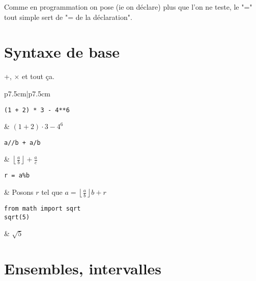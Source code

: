 \documentclass{article}
\begin{document}
Comme en programmation on pose (ie on déclare) plus que l'on ne teste, le "=" tout simple sert de "= de la déclaration".

\section{Syntaxe de base}
+, $\times$ et tout ça.
\begin{table}[h]
	\centering
	\begin{tabular}{p{7.5cm}|p{7.5cm}}
\begin{minipage}{0.5\linewidth}
\begin{verbatim}
(1 + 2) * 3 - 4**6
\end{verbatim}
\end{minipage}
       & $(1+2)\cdot 3 - 4^6$ \\
\begin{minipage}{0.5\linewidth}
\begin{verbatim}
a//b + a/b
\end{verbatim} 
\end{minipage} & $\displaystyle \left\lfloor \frac{a}{b} \right\rfloor + \frac{a}{c}$ \\

\begin{minipage}{0.5\linewidth}
\begin{verbatim}
r = a%b
\end{verbatim}
\end{minipage}
       & Posons $r$ tel que $a = \left\lfloor \frac{a}{b} \right\rfloor b + r$ \\
\hline
\begin{minipage}{0.5\linewidth}
\begin{verbatim}
from math import sqrt 
sqrt(5) 
\end{verbatim}
\end{minipage}
       & $ \sqrt{5}  $ \\
\end{tabular}
\end{table}

\section{Ensembles, intervalles}
\end{document}
